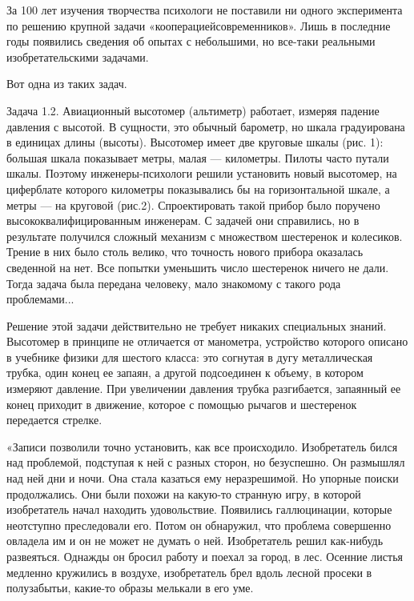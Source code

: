 За  100  лет изучения  творчества  психологи  не поставили  ни  одного
эксперимента  по  решению крупной  задачи  «кооперациейсовременников».
Лишь в  последние годы появились  сведения об опытах с  небольшими, но
все-таки реальными изобретательскими задачами.

Вот одна из таких задач.

Задача  1.2.  Авиационный   высотомер  (альтиметр)  работает,  измеряя
падение  давления  с  высотой.   В  сущности,  это  обычный  барометр,
но   шкала  градуирована   в   единицах   длины  (высоты).   Высотомер
имеет  две   круговые  шкалы   (рис.  1):  большая   шкала  показывает
метры,  малая   —  километры.  Пилоты  часто   путали  шкалы.  Поэтому
инженеры-психологи  решили установить  новый высотомер,  на циферблате
которого километры  показывались бы  на горизонтальной шкале,  а метры
—  на  круговой (рис.2).  Спроектировать  такой  прибор было  поручено
высококвалифицированным  инженерам. С  задачей  они  справились, но  в
результате  получился  сложный  механизм  с  множеством  шестеренок  и
колесиков. Трение в них было столь велико, что точность нового прибора
оказалась  сведенной на  нет. Все  попытки уменьшить  число шестеренок
ничего не дали. Тогда задача  была передана человеку, мало знакомому с
такого рода проблемами...

Решение  этой  задачи  действительно не  требует  никаких  специальных
знаний. Высотомер  в принципе  не отличается от  манометра, устройство
которого описано в учебнике физики  для шестого класса: это согнутая в
дугу металлическая трубка, один конец  ее запаян, а другой подсоединен
к объему, в котором измеряют  давление. При увеличении давления трубка
разгибается, запаянный ее конец приходит в движение, которое с помощью
рычагов и шестеренок передается стрелке.

«Записи позволили точно установить,  как все происходило. Изобретатель
бился над проблемой,  подступая к ней с разных  сторон, но безуспешно.
Он размышлял над ней дни и  ночи. Она стала казаться ему неразрешимой.
Но упорные поиски  продолжались. Они были похожи  на какую-то странную
игру, в  которой изобретатель  начал находить  удовольствие. Появились
галлюцинации, которые неотступно преследовали его. Потом он обнаружил,
что проблема  совершенно овладела им  и он не  может не думать  о ней.
Изобретатель решил  как-нибудь развеяться. Однажды он  бросил работу и
поехал за город,  в лес. Осенние листья медленно  кружились в воздухе,
изобретатель брел вдоль лесной  просеки в полузабытьи, какие-то образы
мелькали в его уме.

